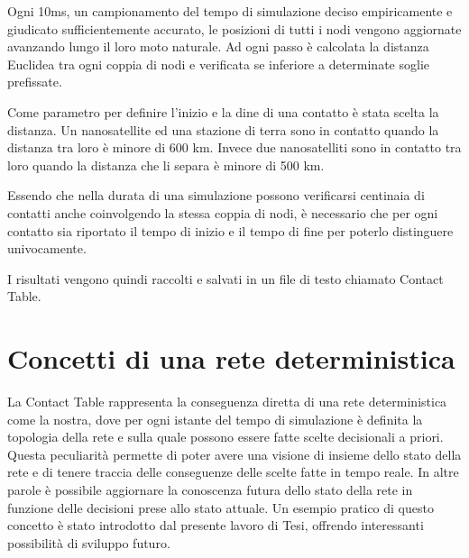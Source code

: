 \documentclass[12pt,a4paper,oneside]{book}
\begin{document}
		Ogni 10ms, un campionamento del tempo di simulazione deciso empiricamente e giudicato sufficientemente accurato, le posizioni di tutti i nodi vengono aggiornate avanzando lungo il loro moto naturale. Ad ogni passo è calcolata la distanza Euclidea tra ogni coppia di nodi e verificata se inferiore a determinate soglie prefissate.		
		
		Come parametro per definire l'inizio e la dine di una contatto è stata scelta la distanza. Un nanosatellite ed una stazione di terra sono in contatto quando la distanza tra loro è minore di 600 km. Invece due nanosatelliti sono in contatto tra loro quando la distanza che li separa è minore di 500 km.

		Essendo che nella durata di una simulazione possono verificarsi centinaia di contatti anche coinvolgendo la stessa coppia di nodi, è necessario che per ogni contatto sia riportato il tempo di inizio e il tempo di fine per poterlo distinguere univocamente. 

		I risultati vengono quindi raccolti e salvati in un file di testo chiamato Contact Table.
		
		
		
		

		\section{Concetti di una rete deterministica} \label{concDet}

		La Contact Table rappresenta la conseguenza diretta di una rete deterministica come la nostra, dove per ogni istante del tempo di simulazione è definita la topologia della rete e sulla quale possono essere fatte scelte decisionali a priori. Questa peculiarità permette di poter avere una visione di insieme dello stato della rete e di tenere traccia delle conseguenze delle scelte fatte in tempo reale. In altre parole è possibile aggiornare la conoscenza futura dello stato della rete in funzione delle decisioni prese allo stato attuale. Un esempio pratico di questo concetto è stato introdotto dal presente lavoro di Tesi, offrendo interessanti possibilità di sviluppo futuro. 
		
\end{document}
